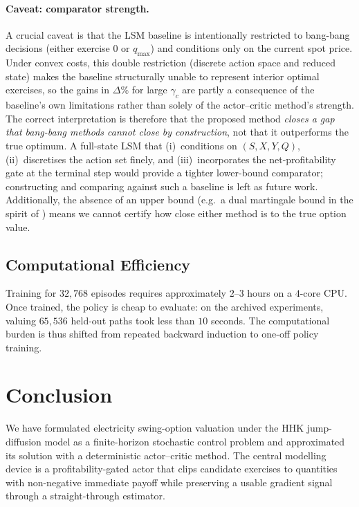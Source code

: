 \documentclass[a4paper,fleqn]{cas-dc}
\begin{document}
\paragraph{Caveat: comparator strength.}
A crucial caveat is that the LSM baseline is intentionally restricted to bang-bang decisions (either exercise $0$ or $q_{\max}$) and conditions only on the current spot price.
Under convex costs, this double restriction (discrete action space and reduced state) makes the baseline structurally unable to represent interior optimal exercises, so the gains in $\Delta\%$ for large $\gamma_c$ are partly a consequence of the baseline's own limitations rather than solely of the actor--critic method's strength.
The correct interpretation is therefore that the proposed method \emph{closes a gap that bang-bang methods cannot close by construction}, not that it outperforms the true optimum.
A full-state LSM that (i)~conditions on $(S, X, Y, Q)$, (ii)~discretises the action set finely, and (iii)~incorporates the net-profitability gate at the terminal step would provide a tighter lower-bound comparator; constructing and comparing against such a baseline is left as future work.
Additionally, the absence of an upper bound (e.g.\ a dual martingale bound in the spirit of \citealt{andersen2004primal}) means we cannot certify how close either method is to the true option value.

\subsection{Computational Efficiency}

Training for $32{,}768$ episodes requires approximately $2$--$3$ hours on a $4$-core CPU. Once trained, the policy is cheap to evaluate: on the archived experiments, valuing $65{,}536$ held-out paths took less than $10$ seconds. The computational burden is thus shifted from repeated backward induction to one-off policy training.

\section{Conclusion}
\label{sec:conclusion}

We have formulated electricity swing-option valuation under the HHK jump-diffusion model as a finite-horizon stochastic control problem and approximated its solution with a deterministic actor--critic method. The central modelling device is a profitability-gated actor that clips candidate exercises to quantities with non-negative immediate payoff while preserving a usable gradient signal through a straight-through estimator.
\end{document}
